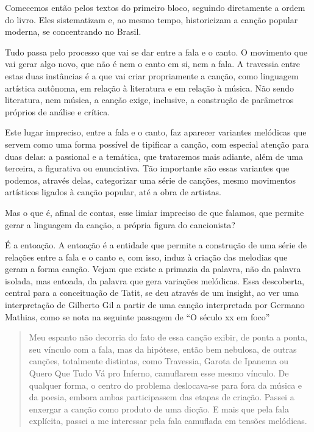Comecemos então pelos textos do primeiro bloco, seguindo diretamente a
ordem do livro. Eles sistematizam e, ao mesmo tempo, historicizam a
canção popular moderna, se concentrando no Brasil.

Tudo passa pelo processo que vai se dar entre a fala e o canto. O
movimento que vai gerar algo novo, que não é nem o canto em si, nem a
fala. A travessia entre estas duas instâncias é a que vai criar
propriamente a canção, como linguagem artística autônoma, em relação à
literatura e em relação à música. Não sendo literatura, nem música, a
canção exige, inclusive, a construção de parâmetros próprios de análise
e crítica.

Este lugar impreciso, entre a fala e o canto, faz aparecer variantes
melódicas que servem como uma forma possível de tipificar a canção, com
especial atenção para duas delas: a passional e a temática, que
trataremos mais adiante, além de uma terceira, a figurativa ou
enunciativa. Tão importante são essas variantes que podemos, através
delas, categorizar uma série de canções, mesmo movimentos artísticos
ligados à canção popular, até a obra de artistas.

Mas o que é, afinal de contas, esse limiar impreciso de que falamos, que
permite gerar a linguagem da canção, a própria figura do cancionista?

É a entoação. A entoação é a entidade que permite a construção de uma
série de relações entre a fala e o canto e, com isso, induz à criação
das melodias que geram a forma canção. Vejam que existe a primazia da
palavra, não da palavra isolada, mas entoada, da palavra que gera
variações melódicas. Essa descoberta, central para a conceituação de
Tatit, se deu através de um insight, ao ver uma interpretação de
Gilberto Gil a partir de uma canção interpretada por Germano Mathias,
como se nota na seguinte passagem de ``O século xx em foco''

\begin{quote}
Meu espanto não decorria do fato de essa canção exibir, de ponta a
ponta, seu vínculo com a fala, mas da hipótese, então bem nebulosa, de
outras canções, totalmente distintas, como Travessia, Garota de Ipanema
ou Quero Que Tudo Vá pro Inferno, camuflarem esse mesmo vínculo. De
qualquer forma, o centro do problema deslocava-se para fora da música e
da poesia, embora ambas participassem das etapas de criação. Passei a
enxergar a canção como produto de uma dicção. E mais que pela fala
explícita, passei a me interessar pela fala camuflada em tensões
melódicas.
\end{quote}

